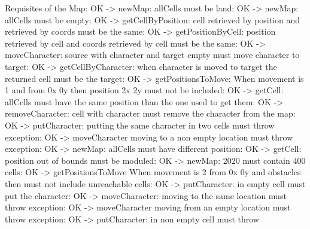 \documentclass[a4paper]{article}
\begin{document}
Requisites of the Map: OK -{\textgreater} newMap: allCells must be land: OK -{\textgreater} newMap: allCells must be empty: OK -{\textgreater} getCellByPosition: cell retrieved by position and
retrieved by coords must be the same: OK -{\textgreater} getPositionByCell: position retrieved by cell and
coords retrieved by cell must be the same: OK -{\textgreater} moveCharacter: source with character and target
empty must move character to target: OK -{\textgreater} getCellByCharacter: when character is moved to
target the returned cell must be the target: OK -{\textgreater} getPositionsToMove: When movement is 1 and from 0x
0y then position 2x 2y must not be included: OK -{\textgreater} getCell: allCells must have the same position than
the one used to get them: OK -{\textgreater} removeCharacter: cell with character must remove
the character from the map: OK -{\textgreater} putCharacter: putting the same character in two
cells must throw exception: OK -{\textgreater} moveCharacter moving to a non empty location must
throw exception: OK -{\textgreater} newMap: allCells must have different
position: OK -{\textgreater} getCell: position out of bounds must be
moduled: OK -{\textgreater} newMap: 20{\texttimes}20 must contain 400
cells: OK -{\textgreater} getPositionsToMove When movement is 2 from 0x 0y
and obstacles then must not include unreachable cells: OK -{\textgreater} putCharacter: in empty cell must put the
character: OK -{\textgreater} moveCharacter: moving to the same location must
throw exception: OK -{\textgreater} moveCharacter moving from an empty location must
throw exception: OK -{\textgreater} putCharacter: in non empty cell must throw
\end{document}
